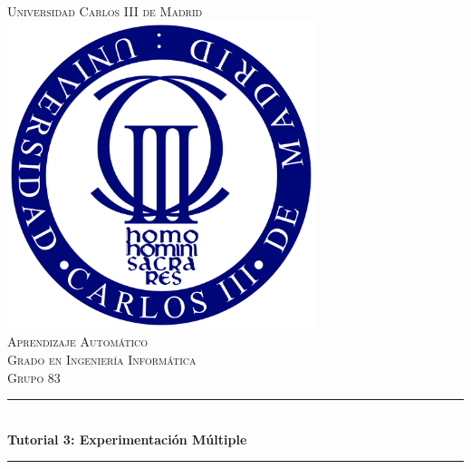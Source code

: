 \documentclass[12pt]{article}
\begin{document}
\begin{titlepage}

\newcommand{\HRule}{\rule{\linewidth}{0.5mm}} %

\center %


\textsc{\LARGE Universidad Carlos III de Madrid}\\[1.2cm] %

\includegraphics[width=9cm]{Logo.png}\\[1.2cm] %

\textsc{\Large Aprendizaje Automático}\\[0.5cm] %
\textsc{\large Grado en Ingeniería Informática}\\[0.6cm] %
\textsc{\large Grupo 83}\\[0.5cm]


\HRule \\[0.7cm]
{ \huge \bfseries Tutorial 3: Experimentación Múltiple}\\[0.4cm] %
\HRule \\[1.3cm]


\end{titlepage}
\end{document}
